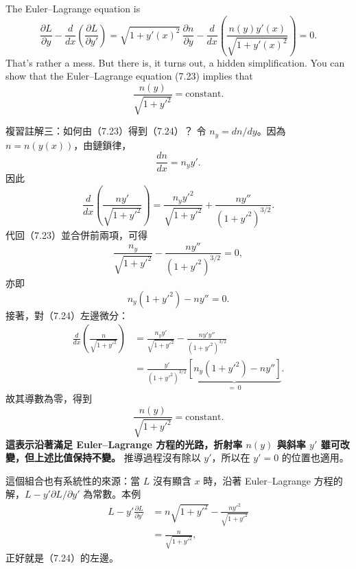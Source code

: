 \documentclass[11pt,a4paper,twoside]{article}
\newcommand{\pnum}[1]{\makebox[0pt][r]{\scriptsize\textbf{[#1]}\hspace{0.7em}}}
\newcommand{\StudyNote}[2]{\begin{studyNote}{#1}#2\end{studyNote}}
\begin{document}
\newpage
\noindent\pnum{36}The Euler--Lagrange equation is
\begingroup\small
\begin{equation}
    \frac{\partial L}{\partial y}-\frac{d}{dx}\left(\frac{\partial L}{\partial y'}\right)
    =\sqrt{1+y'(x)^2}\,\frac{\partial n}{\partial y}
    -\frac{d}{dx}\left(\frac{n(y)y'(x)}{\sqrt{1+y'(x)^2}}\right)=0.
    \tag{7.23}
\end{equation}
\endgroup
\noindent\pnum{37}That's rather a mess. But there is, it turns out, a hidden simplification. You can show that the Euler--Lagrange equation (7.23) implies that
\begin{equation}
    \frac{n(y)}{\sqrt{1+y'^2}}=\text{constant}.
    \tag{7.24}
\end{equation}

\StudyNote{複習註解三：如何由（7.23）得到（7.24）？}{
    令 $n_y=dn/dy$。因為 $n=n(y(x))$，由鏈鎖律，
    \[
        \frac{dn}{dx}=n_y y'.
    \]
    因此
    \[
        \frac{d}{dx}\left(\frac{ny'}{\sqrt{1+y'^2}}\right)
        =\frac{n_y y'^2}{\sqrt{1+y'^2}}
        +\frac{ny''}{(1+y'^2)^{3/2}}.
    \]
    代回（7.23）並合併前兩項，可得
    \[
        \frac{n_y}{\sqrt{1+y'^2}}
        -\frac{ny''}{(1+y'^2)^{3/2}}=0,
    \]
    亦即
    \[
        \boxed{n_y(1+y'^2)-ny''=0.}
    \]
    接著，對（7.24）左邊微分：
    \[
        \begin{aligned}
            \frac{d}{dx}\left(\frac{n}{\sqrt{1+y'^2}}\right)
             & =\frac{n_y y'}{\sqrt{1+y'^2}}
            -\frac{ny'y''}{(1+y'^2)^{3/2}}   \\
             & =\frac{y'}{(1+y'^2)^{3/2}}
            \underbrace{\left[n_y(1+y'^2)-ny''\right]}_{=\,0}.
        \end{aligned}
    \]
    故其導數為零，得到
    \[
        \boxed{\frac{n(y)}{\sqrt{1+y'^2}}=\text{constant}.}
    \]
    \textbf{這表示沿著滿足 Euler--Lagrange 方程的光路，折射率 $n(y)$ 與斜率 $y'$ 雖可改變，但上述比值保持不變。}
    推導過程沒有除以 $y'$，所以在 $y'=0$ 的位置也適用。

    這個組合也有系統性的來源：當 $L$ 沒有顯含 $x$ 時，沿著 Euler--Lagrange 方程的解，$L-y'\partial L/\partial y'$ 為常數。本例
    \[
        \begin{aligned}
            L-y'\frac{\partial L}{\partial y'}
             & =n\sqrt{1+y'^2}-\frac{ny'^2}{\sqrt{1+y'^2}} \\
             & =\frac{n}{\sqrt{1+y'^2}},
        \end{aligned}
    \]
    正好就是（7.24）的左邊。
}
\end{document}
